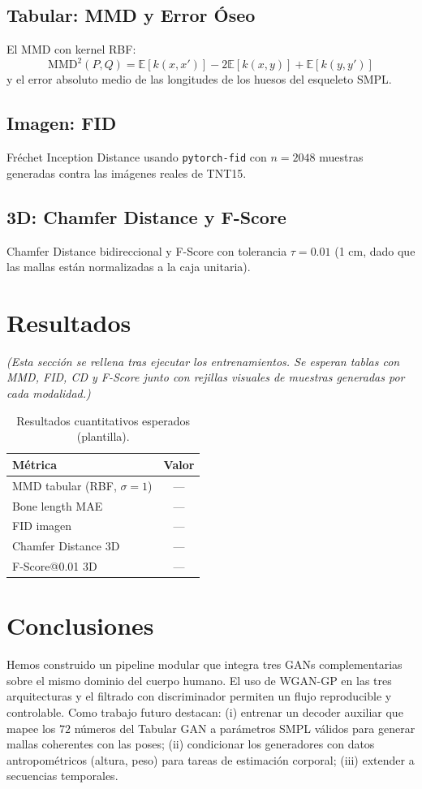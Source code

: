 \documentclass[11pt,a4paper,twocolumn]{article}
\begin{document}
\subsection{Tabular: MMD y Error Óseo}
El MMD con kernel RBF:
\[
\text{MMD}^2(P,Q) = \mathbb{E}[k(x,x')] - 2\mathbb{E}[k(x,y)] + \mathbb{E}[k(y,y')]
\]
y el error absoluto medio de las longitudes de los huesos del esqueleto SMPL.

\subsection{Imagen: FID}
Fréchet Inception Distance usando \texttt{pytorch-fid} con $n=2048$
muestras generadas contra las imágenes reales de TNT15.

\subsection{3D: Chamfer Distance y F-Score}
Chamfer Distance bidireccional y F-Score con tolerancia $\tau=0.01$
(1 cm, dado que las mallas están normalizadas a la caja unitaria).

\section{Resultados}

\textit{(Esta sección se rellena tras ejecutar los entrenamientos. Se
esperan tablas con MMD, FID, CD y F-Score junto con rejillas visuales de
muestras generadas por cada modalidad.)}

\begin{table}[h]
\centering
\caption{Resultados cuantitativos esperados (plantilla).}
\begin{tabular}{lc}
\toprule
Métrica & Valor \\
\midrule
MMD tabular (RBF, $\sigma=1$) & --- \\
Bone length MAE & --- \\
FID imagen & --- \\
Chamfer Distance 3D & --- \\
F-Score@0.01 3D & --- \\
\bottomrule
\end{tabular}
\end{table}

\section{Conclusiones}

Hemos construido un pipeline modular que integra tres GANs complementarias
sobre el mismo dominio del cuerpo humano. El uso de WGAN-GP en las tres
arquitecturas y el filtrado con discriminador permiten un flujo reproducible
y controlable. Como trabajo futuro destacan: (i) entrenar un decoder
auxiliar que mapee los $72$ números del Tabular GAN a parámetros SMPL
válidos para generar mallas coherentes con las poses; (ii) condicionar los
generadores con datos antropométricos (altura, peso) para tareas de
estimación corporal; (iii) extender a secuencias temporales.
\end{document}
